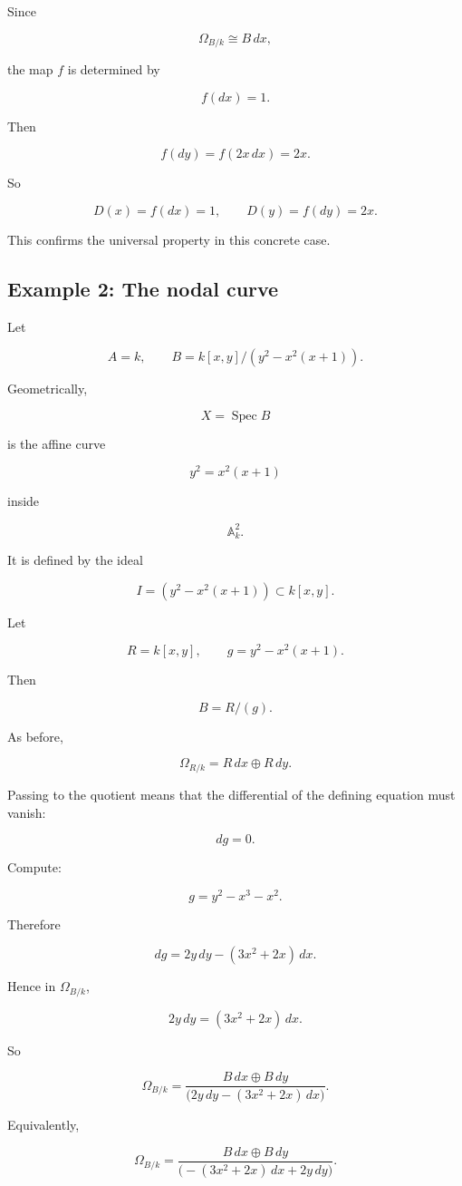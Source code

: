 \documentclass[12pt,a4paper]{article}
\theoremstyle{notespace}
\begin{document}
Since

\[
\Omega_{B/k}\cong B\,dx,
\]

the map \(f\) is determined by

\[
f(dx)=1.
\]

Then

\[
f(dy)=f(2x\,dx)=2x.
\]

So

\[
D(x)=f(dx)=1,
\qquad
D(y)=f(dy)=2x.
\]

This confirms the universal property in this concrete case.

\subsection{Example 2: The nodal curve}

Let

\[
A=k,
\qquad
B=k[x,y]/(y^2-x^2(x+1)).
\]

Geometrically,

\[
X=\operatorname{Spec}B
\]

is the affine curve

\[
y^2=x^2(x+1)
\]

inside

\[
\mathbb A^2_k.
\]

It is defined by the ideal

\[
I=(y^2-x^2(x+1))\subset k[x,y].
\]

Let

\[
R=k[x,y],
\qquad
g=y^2-x^2(x+1).
\]

Then

\[
B=R/(g).
\]

As before,

\[
\Omega_{R/k}=R\,dx\oplus R\,dy.
\]

Passing to the quotient means that the differential of the defining equation must vanish:

\[
dg=0.
\]

Compute:

\[
g=y^2-x^3-x^2.
\]

Therefore

\[
dg=2y\,dy-(3x^2+2x)\,dx.
\]

Hence in \(\Omega_{B/k}\),

\[
2y\,dy=(3x^2+2x)\,dx.
\]

So

\[
\Omega_{B/k}
=
\frac{B\,dx\oplus B\,dy}
{\bigl(2y\,dy-(3x^2+2x)\,dx\bigr)}.
\]

Equivalently,

\[
\Omega_{B/k}
=
\frac{B\,dx\oplus B\,dy}
{\bigl(-(3x^2+2x)\,dx+2y\,dy\bigr)}.
\]
\end{document}
